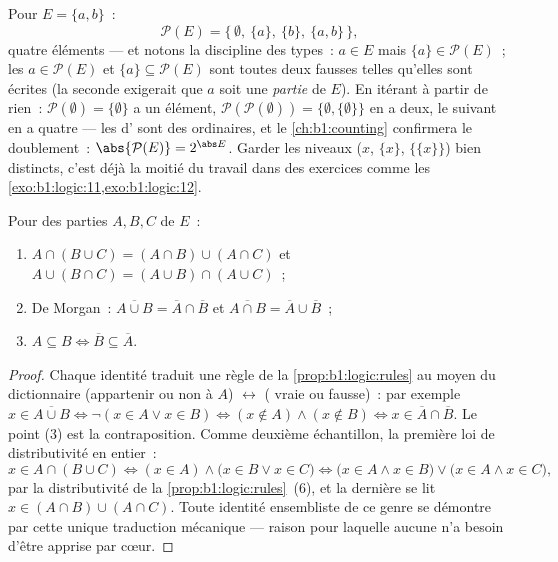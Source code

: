 \begin{example}\label{ex:b1:logic:powerset}
Pour $E = \{a, b\}$~:
\[
\mathcal P(E) = \bigl\{\, \emptyset,\ \{a\},\ \{b\},\ \{a, b\}
\,\bigr\},
\]
quatre éléments --- et notons la discipline des types~: $a \in E$ mais
$\{a\} \in \mathcal P(E)$~; les  $a \in \mathcal P(E)$ et
$\{a\} \subseteq \mathcal P(E)$ sont toutes deux fausses telles
qu'elles sont écrites (la seconde exigerait que $a$ soit une
\emph{partie} de $E$). En itérant à partir de rien~:
$\mathcal P(\emptyset) = \{\emptyset\}$ a un élément,
$\mathcal P(\mathcal P(\emptyset)) = \{\emptyset, \{\emptyset\}\}$ en a
deux, le suivant en a quatre --- les  d' sont des
 ordinaires, et le \cref{ch:b1:counting} confirmera le
doublement~: $\abs{\mathcal P(E)} = 2^{\abs E}$. Garder les niveaux
($x$, $\{x\}$, $\{\{x\}\}$) bien distincts, c'est déjà la moitié du
travail dans des exercices comme
les \cref{exo:b1:logic:11,exo:b1:logic:12}.
\end{example}

\begin{proposition}\label{prop:b1:logic:setalgebra}
Pour des parties $A, B, C$ de $E$~:
\begin{enumerate}
  \item $A \cap (B \cup C) = (A \cap B) \cup (A \cap C)$ et
        $A \cup (B \cap C) = (A \cup B) \cap (A \cup C)$~;
  \item De Morgan~: $\overline{A \cup B} = \overline{A} \cap
        \overline{B}$ et $\overline{A \cap B} = \overline{A} \cup
        \overline{B}$~;
  \item $A \subseteq B \iff \overline{B} \subseteq \overline{A}$.
\end{enumerate}
\end{proposition}

\begin{proof}
Chaque identité traduit une règle de la \cref{prop:b1:logic:rules} au
moyen du dictionnaire (appartenir ou non à $A$) $\leftrightarrow$
( vraie ou fausse)~: par exemple $x \in \overline{A \cup B}
\iff \lnot(x \in A \lor x \in B) \iff (x \notin A) \land (x \notin B)
\iff x \in \overline{A} \cap \overline{B}$. Le point (3) est la
contraposition. Comme deuxième échantillon, la première loi de
distributivité en entier~:
\[
x \in A \cap (B \cup C)
\iff (x \in A) \land \bigl(x \in B \lor x \in C\bigr)
\iff \bigl(x \in A \land x \in B\bigr) \lor
\bigl(x \in A \land x \in C\bigr),
\]
par la distributivité de la \cref{prop:b1:logic:rules}~(6), et la dernière
 se lit $x \in (A \cap B) \cup (A \cap C)$. Toute identité
ensembliste de ce genre se démontre par cette unique traduction
mécanique --- raison pour laquelle aucune n'a besoin d'être apprise par
cœur.
\end{proof}

